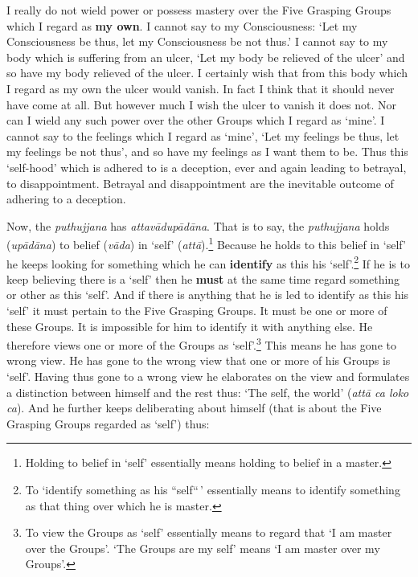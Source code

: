 I really do not wield power or possess mastery over the Five Grasping Groups which I regard as \textbf{my own}. I cannot say to my Consciousness: `Let my Consciousness be thus, let my Consciousness be not thus.' I cannot say to my body which is suffering from an ulcer, `Let my body be relieved of the ulcer' and so have my body relieved of the ulcer. I certainly wish that from this body which I regard as my own the ulcer would vanish. In fact I think that it should never have come at all. But however much I wish the ulcer to vanish it does not. Nor can I wield any such power over the other Groups which I regard as `mine'. I cannot say to the feelings which I regard as `mine', `Let my feelings be thus, let my feelings be not thus', and so have my feelings as I want them to be. Thus this `self-hood' which is adhered to is a deception, ever and again leading to betrayal, to disappointment. Betrayal and disappointment are the inevitable outcome of adhering to a deception.

Now, the \emph{puthujjana} has \emph{attavādupādāna}. That is to say, the \emph{puthujjana} holds (\emph{upādāna}) to belief (\emph{vāda}) in `self' (\emph{attā}).\footnote{Holding to belief in `self' essentially means holding to belief in a master.} Because he holds to this belief in `self' he keeps looking for something which he can \textbf{identify} as this his `self'.\footnote{To `identify something as his ``self``\,' essentially means to identify something as that thing over which he is master.} If he is to keep believing there is a `self' then he \textbf{must} at the same time regard something or other as this `self'. And if there is anything that he is led to identify as this his `self' it must pertain to the Five Grasping Groups. It must be one or more of these Groups. It is impossible for him to identify it with anything else. He therefore views one or more of the Groups as `self'.\footnote{To view the Groups as `self' essentially means to regard that `I am master over the Groups'. `The Groups are my self' means `I am master over my Groups'.} This means he has gone to wrong view. He has gone to the wrong view that one or more of his Groups is `self'. Having thus gone to a wrong view he elaborates on the view and formulates a distinction between himself and the rest thus: `The self, the world' (\emph{attā ca loko ca}). And he further keeps deliberating about himself (that is about the Five Grasping Groups regarded as `self') thus:

